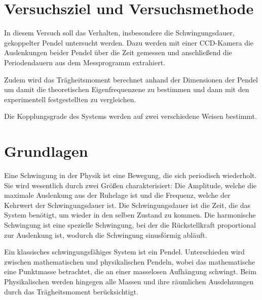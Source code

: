 \documentclass[
12pt,
a4paper,
bibliography=totocnumbered, %
BCOR=1cm, %
oneside, %
]{scrartcl}
\begin{document}
\thispagestyle{empty}



\thispagestyle{empty}

\tableofcontents

\clearpage %

\renewcommand{\thepage}{\arabic{page}}
\setcounter{page}{1}


\section[Versuchsziel]{Versuchsziel und Versuchsmethode}

In diesem Versuch soll das Verhalten, insbesondere die Schwingungsdauer, gekoppelter Pendel untersucht werden. Dazu werden mit einer CCD-Kamera die Auslenkungen beider Pendel über die Zeit gemessen und anschließend die Periodendauern aus dem Messprogramm extrahiert.

Zudem wird das Trägheitsmoment berechnet anhand der Dimensionen der Pendel um damit die theoretischen Eigenfrequenzene zu bestimmen und dann mit den experimentell festgestellten zu vergleichen.

Die Kopplungsgrade des Systems werden auf zwei verschiedene Weisen bestimmt.

\section{Grundlagen}

Eine Schwingung in der Physik ist eine Bewegung, die sich periodisch wiederholt. Sie wird wesentlich durch zwei Größen charakterisiert: Die Amplitude, welche die maximale Auslenkung aus der Ruhelage ist und die Frequenz, welche der Kehrwert der Schwingungsdauer ist. Die Schwingungsdauer ist die Zeit, die das System benötigt, um wieder in den selben Zustand zu kommen. Die harmonische Schwingung ist eine spezielle Schwingung, bei der die Rückstellkraft proportional zur Auslenkung ist, wodurch die Schwingung sinusförmig abläuft.

Ein klassisches schwingungsfähiges  System ist ein Pendel. Unterschieden wird zwischen mathematischen und physikalischen Pendeln, wobei das mathematische eine Punktmasse betrachtet, die an einer masselosen Aufhängung schwingt. Beim Physikalischen werden hingegen alle Massen und ihre räumlichen Ausdehnungen durch das Trägheitsmoment berücksichtigt.
\end{document}

